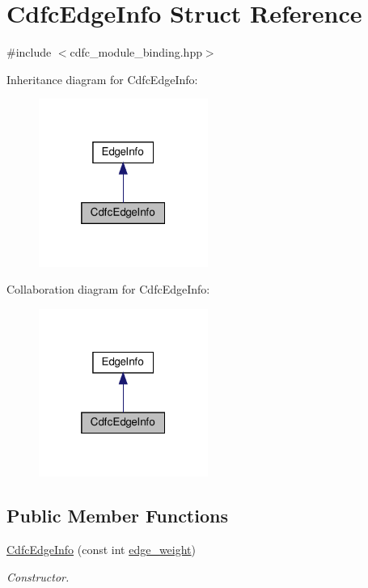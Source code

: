 \hypertarget{structCdfcEdgeInfo}{}\section{Cdfc\+Edge\+Info Struct Reference}
\label{structCdfcEdgeInfo}


{\ttfamily \#include $<$cdfc\+\_\+module\+\_\+binding.\+hpp$>$}



Inheritance diagram for Cdfc\+Edge\+Info\+:
\nopagebreak
\begin{figure}[H]
\begin{center}
\leavevmode
\includegraphics[width=157pt]{d6/d9d/structCdfcEdgeInfo__inherit__graph}
\end{center}
\end{figure}


Collaboration diagram for Cdfc\+Edge\+Info\+:
\nopagebreak
\begin{figure}[H]
\begin{center}
\leavevmode
\includegraphics[width=157pt]{d1/d34/structCdfcEdgeInfo__coll__graph}
\end{center}
\end{figure}
\subsection*{Public Member Functions}
\begin{DoxyCompactItemize}
\item 
\hyperlink{structCdfcEdgeInfo_a30d8de9a57218fed42c5890585be6f30}{Cdfc\+Edge\+Info} (const int \hyperlink{structCdfcEdgeInfo_aef41c6921d9241b4acb077996767f52d}{edge\+\_\+weight})
\begin{DoxyCompactList}\small\item\em Constructor. \end{DoxyCompactList}\end{DoxyCompactItemize}
